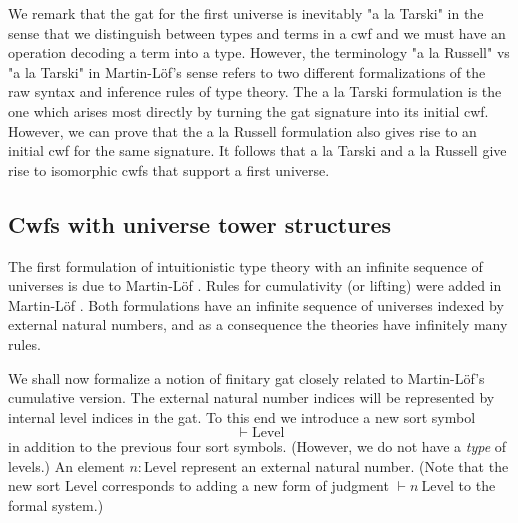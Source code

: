 \documentclass{lmcs}
\newcommand{\Level}{\mathrm{Level}}
\begin{document}
We remark that the gat for the first universe is inevitably "a la Tarski" in the sense that we distinguish between types and terms in a cwf and we must have an operation decoding a term into a type. However, the terminology "a la Russell" vs "a la Tarski" in Martin-Löf's sense refers to two different formalizations of the raw syntax and inference rules of type theory. The a la Tarski formulation is the one which arises most directly by turning the gat signature into its initial cwf. However, we can prove that the a la Russell formulation also gives rise to an initial cwf for the same signature. It follows that a la Tarski and a la Russell give rise to isomorphic cwfs that support a first universe.

\subsection{Cwfs with universe tower structures} 

The first formulation of intuitionistic type theory with an infinite sequence of universes is due to Martin-Löf
\cite{martinlof:predicative}. Rules for cumulativity (or lifting) were added in Martin-Löf \cite{martinlof:hannover}. Both formulations have an infinite sequence of universes indexed by external natural numbers, and as a consequence the theories have infinitely many rules. 

We shall now formalize a notion of finitary gat closely related to Martin-Löf's cumulative version. The external natural number indices will be represented by internal level indices in the gat. To this end we introduce a new sort symbol 
$$
\vdash \Level
$$
in addition to the previous four sort symbols. (However, we do not have a {\em type} of levels.) An element $n : \Level$ represent an external natural number. (Note that the new sort $\Level$ corresponds to adding a new form of judgment $\vdash n\  \Level$ to the formal system.)
\end{document}
